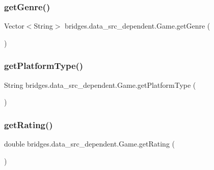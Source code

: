 \subsubsection{\texorpdfstring{get\+Genre()}{getGenre()}}
{\footnotesize\ttfamily Vector$<$String$>$ bridges.\+data\+\_\+src\+\_\+dependent.\+Game.\+get\+Genre (\begin{DoxyParamCaption}{ }\end{DoxyParamCaption})}

\hypertarget{classbridges_1_1data__src__dependent_1_1_game_a1eef8e419c6302ba83ea595491412494}{}\label{classbridges_1_1data__src__dependent_1_1_game_a1eef8e419c6302ba83ea595491412494} 
\subsubsection{\texorpdfstring{get\+Platform\+Type()}{getPlatformType()}}
{\footnotesize\ttfamily String bridges.\+data\+\_\+src\+\_\+dependent.\+Game.\+get\+Platform\+Type (\begin{DoxyParamCaption}{ }\end{DoxyParamCaption})}

\hypertarget{classbridges_1_1data__src__dependent_1_1_game_a83b444e2c487701b4e9789a6a35ae210}{}\label{classbridges_1_1data__src__dependent_1_1_game_a83b444e2c487701b4e9789a6a35ae210} 
\subsubsection{\texorpdfstring{get\+Rating()}{getRating()}}
{\footnotesize\ttfamily double bridges.\+data\+\_\+src\+\_\+dependent.\+Game.\+get\+Rating (\begin{DoxyParamCaption}{ }\end{DoxyParamCaption})}

\hypertarget{classbridges_1_1data__src__dependent_1_1_game_af92a6fdd0e852e6cc5d97fb193be4ca9}{}\label{classbridges_1_1data__src__dependent_1_1_game_af92a6fdd0e852e6cc5d97fb193be4ca9} 
